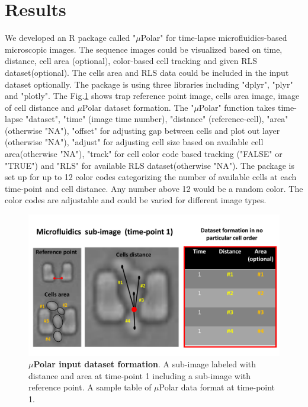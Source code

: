 \documentclass[conference]{IEEEtran}
\begin{document}
 


\section{Results}

We developed an R package called "$\mu$Polar" for time-lapse microfluidics-based microscopic images. The sequence images could be visualized based on time, distance, cell area (optional), color-based cell tracking and given RLS dataset(optional). The cells area and RLS data could be included in the input dataset optionally. The package is using three libraries including "dplyr", "plyr" and "plotly". The Fig.\ref{fig:table} shows trap reference point image, cells area image, image of cell distance and $\mu$Polar dataset formation. The "$\mu$Polar" function takes time-lapse "dataset", "time" (image time number), "distance" (reference-cell), "area" (otherwise "NA"), "offset" for adjusting gap between cells and plot out layer (otherwise "NA"), "adjust" for  adjusting  cell size based on available cell area(otherwise "NA"), "track" for cell color code based tracking ("FALSE" or "TRUE") and "RLS" for available RLS dataset(otherwise "NA"). The package is set up for up to 12 color codes categorizing the number of available cells at each time-point and cell distance. Any number above 12 would be a random color. The color codes are adjustable and could be varied for different image types.  

\begin{figure}
\centering
\includegraphics[width=\textwidth,height=10 cm]{Patterns/table.pdf}
\caption{ \textbf{ $\mu$Polar input dataset formation}. A sub-image labeled with distance and area at time-point 1 including a sub-image with reference point. A sample table of $\mu$Polar data format at time-point 1.}
\label{fig:table}
\end{figure}
\end{document}
